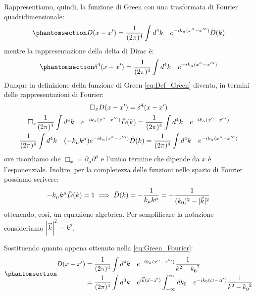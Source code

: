 Rappresentiamo, quindi, la funzione di Green con una trasformata di Fourier quadridimensionale:
\begin{equation}\phantomsection\label{eq:Green_Fourier}
  D(x-x')=\dfrac{1}{(2\pi)^4}\int d^4k\quad e^{-ik_\alpha(x^\alpha-x'^\alpha)} \Tilde{D}(k)
\end{equation}
mentre la rappresentazione della delta di Dirac è:
\begin{equation}\phantomsection\label{eq:Dirac_Fourier}
  \delta^4(x-x')=\dfrac{1}{(2\pi)^4}\int d^4k\quad e^{-ik_\alpha(x^\alpha-x'^\alpha)} 
\end{equation}
Dunque la definizione della funzione di Green \eqref{eq:Def_Green} diventa, in termini delle rappresentazioni di Fourier:
\begin{equation}
\begin{gathered}
        \Box_x D(x-x')=\delta^4(x-x')\\  \Box_x \dfrac{1}{(2\pi)^4}\int d^4k\quad e^{-ik_\alpha(x^\alpha-x'^\alpha)} \Tilde{D}(k)=\dfrac{1}{(2\pi)^4}\int d^4k\quad e^{-ik_\alpha(x^\alpha-x'^\alpha)} \\
        \dfrac{1}{(2\pi)^4}\int d^4k\quad (-k_\mu k^\mu)e^{-ik_\alpha(x^\alpha-x'^\alpha)} \Tilde{D}(k)=\dfrac{1}{(2\pi)^4}\int d^4k\quad e^{-ik_\alpha(x^\alpha-x'^\alpha)}
\end{gathered}
\end{equation}
ove ricordiamo che $\Box_x=\partial_\mu\partial^\mu$ e l'unico termine che dipende da $x$ è l'esponenziale. Inoltre, per la completezza delle funzioni nello spazio di Fourier possiamo scrivere:\begin{equation}
-k_\mu k^\mu \Tilde{D}(k)=1 \implies \Tilde{D}(k)=-\dfrac{1}{k_\mu k^\mu}=-\dfrac{1}{(k_0)^2 -|\Vec{k}|^2}
\end{equation}
ottenendo, così, un equazione algebrica. Per semplificare la notazione consideriamo $|\Vec{k}|^2=k^2$. 

Sostituendo quanto appena ottenuto nella \eqref{eq:Green_Fourier}:
\begin{equation}\phantomsection\label{eq:int_green}
\begin{split}
     D(x-x')&=\dfrac{1}{(2\pi)^4}\int d^4k\quad e^{-ik_\alpha(x^\alpha-x'^\alpha)}\dfrac{1}{k^2-k\indices{_0^2}}\\
     &=\dfrac{1}{(2\pi)^4}\int d^3k\quad e^{i\Vec{k}(\Vec{x}-\Vec{x}')}\int^{\infty}_{-\infty} dk_0\quad e^{-ik_0(ct-ct')}\dfrac{1}{k^2-k\indices{_0^2}}
\end{split}
\end{equation}

